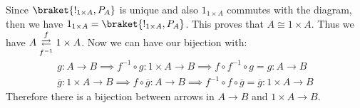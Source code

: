         Since $\braket{!_{1 \times A}, P_A}$ is unique and also $1_{1 \times A}$ commutes with the diagram, then we have $1_{1 \times A} = \braket{!_{1 \times A}, P_A}$. This proves that $A \cong 1 \times A$. Thus we have $A \overunderset{f}{f^{-1}}{\rightleftarrows} 1 \times A$. Now we can have our bijection with:
        \begin{gather*}
            g: A \to B \implies f^{-1} \circ g : 1 \times A \to B \implies f \circ f^{-1} \circ g = g: A \to B\\
            \overline{g}: 1 \times A \to B \implies f \circ \overline{g}: A \to B \implies f^{-1} \circ f \circ \overline{g} = \overline{g}: 1 \times A \to B
        \end{gather*}
        Therefore there is a bijection between arrows in $A \to B$ and $1 \times A \to B$.